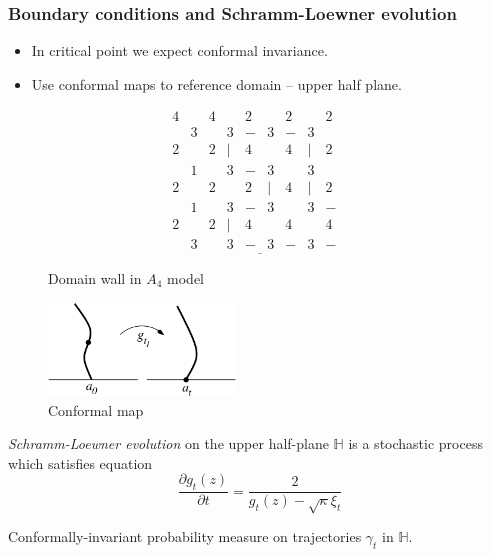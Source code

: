 \documentclass[pdftex]{beamer}
\theoremstyle{definition} \newtheorem{Def}{Definition}
\begin{document}
\begin{frame}
  \frametitle{Boundary conditions and Schramm-Loewner evolution}
  \begin{itemize}
  \item In critical point we expect conformal invariance.
  \item Use conformal maps to reference domain -- upper half plane. 
  \end{itemize}
  \begin{figure}[h]
    \begin{multicols}{2}

\begin{minipage}[h]{1.0\linewidth}
\vspace{-1cm}
\begin{equation*}
  \label{eq:13}
  \underline{\begin{array}{llllllllll}
    4 & & 4 &  & 2 &  & 2 &  & 2\\
    & 3 & & 3 & - & 3 & -  & 3 & & \\
    2 & & 2 & | & 4 &  & 4 & | & 2\\
    & 1 & & 3 & - & 3 &   & 3 & & \\
    2 & & 2 &  & 2 & | & 4 & | & 2\\
    & 1 & & 3 & - & 3 & & 3 &- & \\
    2 & & 2 & | & 4 & & 4 & & 4\\
    &  3 & & 3 &- & 3 &- & 3 &- &
  \end{array}}
\end{equation*}
\vspace{-0.7cm}
\caption{Domain wall in $A_{4}$ model}
\end{minipage}


      \includegraphics[width=50mm]{loewner.pdf}
      \caption{Conformal map}
      \label{fig:sle}
    \end{multicols}
  \end{figure}    
 \vspace{-0.7cm}
    {\it Schramm-Loewner evolution} on the upper half-plane $\mathbb{H}$ is a stochastic process which satisfies equation
    \begin{equation*}
      \frac{\partial g_t(z)}{\partial t} = \frac{ 2}{g_t(z)-\sqrt{\kappa}\xi_{t}}%
    \end{equation*}

  Conformally-invariant probability measure on trajectories $\gamma_{t}$ in $\mathbb{H}$.

\end{frame}
\end{document}
